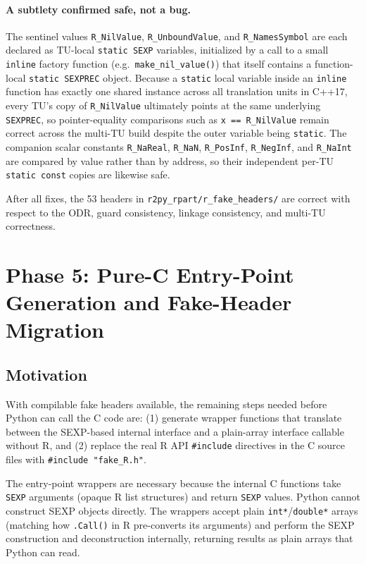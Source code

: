 \documentclass[12pt]{article}
\begin{document}
\paragraph{A subtlety confirmed safe, not a bug.} The sentinel values \texttt{R\_NilValue}, \texttt{R\_UnboundValue}, and \texttt{R\_NamesSymbol} are each declared as TU-local \texttt{static SEXP} variables, initialized by a call to a small \texttt{inline} factory function (e.g.\ \texttt{make\_nil\_value()}) that itself contains a function-local \texttt{static SEXPREC} object. Because a \texttt{static} local variable inside an \texttt{inline} function has exactly one shared instance across all translation units in C++17, every TU's copy of \texttt{R\_NilValue} ultimately points at the same underlying \texttt{SEXPREC}, so pointer-equality comparisons such as \texttt{x == R\_NilValue} remain correct across the multi-TU build despite the outer variable being \texttt{static}. The companion scalar constants \texttt{R\_NaReal}, \texttt{R\_NaN}, \texttt{R\_PosInf}, \texttt{R\_NegInf}, and \texttt{R\_NaInt} are compared by value rather than by address, so their independent per-TU \texttt{static const} copies are likewise safe.

After all fixes, the 53 headers in \texttt{r2py\_rpart/r\_fake\_headers/} are correct with respect to the ODR, guard consistency, linkage consistency, and multi-TU correctness.

\section{Phase 5: Pure-C Entry-Point Generation and Fake-Header Migration}
\label{sec:phase5}

\subsection{Motivation}

With compilable fake headers available, the remaining steps needed before Python can call the C code are: (1) generate wrapper functions that translate between the SEXP-based internal interface and a plain-array interface callable without R, and (2) replace the real R API \texttt{\#include} directives in the C source files with \texttt{\#include "fake\_R.h"}.

The entry-point wrappers are necessary because the internal C functions take \texttt{SEXP} arguments (opaque R list structures) and return \texttt{SEXP} values. Python cannot construct SEXP objects directly. The wrappers accept plain \texttt{int*}/\texttt{double*} arrays (matching how \texttt{.Call()} in R pre-converts its arguments) and perform the SEXP construction and deconstruction internally, returning results as plain arrays that Python can read.
\end{document}
